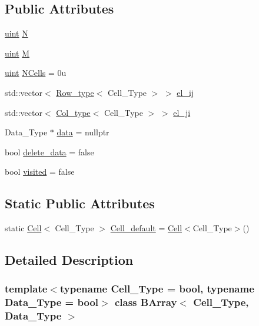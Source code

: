 \subsection*{Public Attributes}
\begin{DoxyCompactItemize}
\item 
\hyperlink{typedefs_8hpp_a91ad9478d81a7aaf2593e8d9c3d06a14}{uint} \hyperlink{class_b_array_a4b34ec8636c989efe80bbe3f1cea217e}{N}
\item 
\hyperlink{typedefs_8hpp_a91ad9478d81a7aaf2593e8d9c3d06a14}{uint} \hyperlink{class_b_array_a197359753fd1bc054a1a14f7641d3fd1}{M}
\item 
\hyperlink{typedefs_8hpp_a91ad9478d81a7aaf2593e8d9c3d06a14}{uint} \hyperlink{class_b_array_a31fd64c6b54408ca98e07abc9c4241c5}{N\+Cells} = 0u
\item 
std\+::vector$<$ \hyperlink{typedefs_8hpp_a83d6ee40a2ba22844108bb8b82e9b951}{Row\+\_\+type}$<$ Cell\+\_\+\+Type $>$ $>$ \hyperlink{class_b_array_a2161dc7c2046a57d3e663ac5c0d70431}{el\+\_\+ij}
\item 
std\+::vector$<$ \hyperlink{typedefs_8hpp_a00f3fedec1671706175b572e5c57ee0b}{Col\+\_\+type}$<$ Cell\+\_\+\+Type $>$ $>$ \hyperlink{class_b_array_aad8ce1aa5fddd3899164c1aa1dfede94}{el\+\_\+ji}
\item 
Data\+\_\+\+Type $\ast$ \hyperlink{class_b_array_a9576163b52124021575e50dbcca2f6b9}{data} = nullptr
\item 
bool \hyperlink{class_b_array_a1e932e3353905d77a2062560ee96b2fc}{delete\+\_\+data} = false
\item 
bool \hyperlink{class_b_array_ae0860bf21425397d1498f94da6518e85}{visited} = false
\end{DoxyCompactItemize}
\subsection*{Static Public Attributes}
\begin{DoxyCompactItemize}
\item 
static \hyperlink{class_cell}{Cell}$<$ Cell\+\_\+\+Type $>$ \hyperlink{class_b_array_a5700cd9bb3814f84c62dda0ea47931bc}{Cell\+\_\+default} = \hyperlink{class_cell}{Cell}$<$Cell\+\_\+\+Type$>$()
\end{DoxyCompactItemize}


\subsection{Detailed Description}
\subsubsection*{template$<$typename Cell\+\_\+\+Type = bool, typename Data\+\_\+\+Type = bool$>$\newline
class B\+Array$<$ Cell\+\_\+\+Type, Data\+\_\+\+Type $>$}

